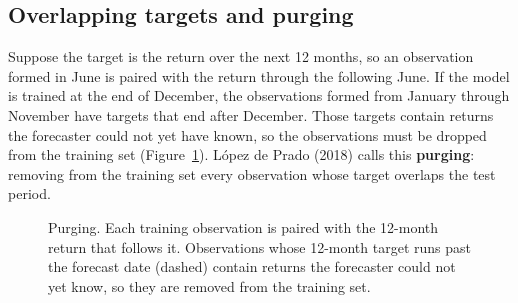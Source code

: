\subsection{Overlapping targets and purging} 


Suppose the target is the return over the next 12 months, so an observation formed in June is paired with the return through the following June. If the model is trained at the end of December, the observations formed from January through November have targets that end after December. Those targets contain returns the forecaster could not yet have known, so the observations must be dropped from the training set (Figure~\ref{fig:05-purging}). L\'opez de Prado (2018) calls this \textbf{purging}: removing from the training set every observation whose target overlaps the test period.


\begin{figure}[htbp]
  \centering
  \caption{Purging. Each training observation is paired with the 12-month
    return that follows it. Observations whose 12-month target runs past the
    forecast date (dashed) contain returns the forecaster could not yet know,
    so they are removed from the training set.}
  \label{fig:05-purging}
\end{figure}


